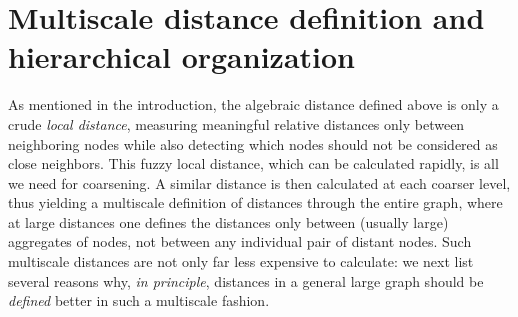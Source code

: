 \documentclass[final]{siamltex}
\begin{document}
\section{Multiscale distance definition and hierarchical organization}\label{multiscale}
As mentioned in the introduction, the algebraic distance defined
above is only a crude {\it local distance}, measuring meaningful
relative distances only between neighboring nodes while also
detecting which nodes should not be considered as close neighbors.
This fuzzy local distance, which can be calculated rapidly, is
all we need for coarsening. A similar distance is then
calculated at each coarser level, thus yielding a multiscale
definition of distances through the entire graph, where at large
distances one defines the distances only between (usually large)
aggregates of nodes, not between any individual pair of distant
nodes. Such multiscale distances are not only far less expensive
to calculate: we next list several reasons why, {\it in principle},
distances in a general large graph should be {\it defined} better
in such a multiscale fashion.
\end{document}
